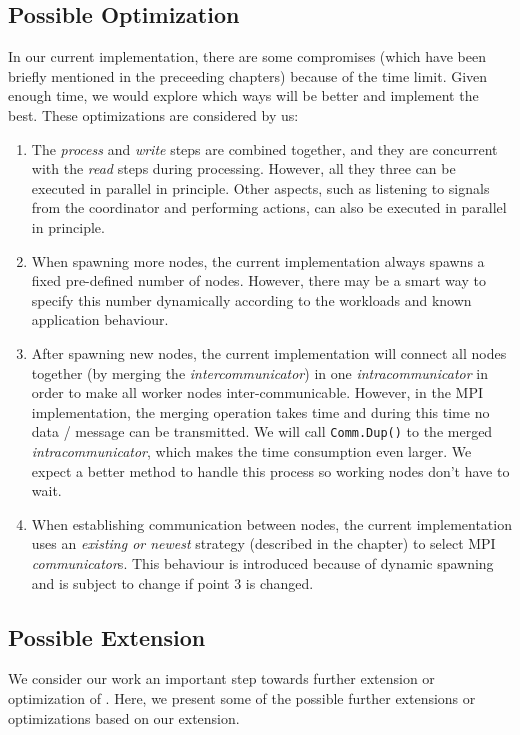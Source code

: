 \subsection{Possible Optimization}
In our current implementation, there are some compromises (which have been briefly mentioned in the preceeding chapters) because of the time limit. Given enough time, we would explore which ways will be better and implement the best. These optimizations are considered by us:

\begin{enumerate}
	\item The \emph{process} and \emph{write} steps are combined together, and they are concurrent with the \emph{read} steps during processing. However, all they three can be executed in parallel in principle. Other aspects, such as listening to signals from the coordinator and performing actions, can also be executed in parallel in principle.
	\item When spawning more nodes, the current implementation always spawns a fixed pre-defined number of nodes. However, there may be a smart way to specify this number dynamically according to the workloads and known application behaviour.
	\item After spawning new nodes, the current implementation will connect all nodes together (by merging the \emph{intercommunicator}) in one \emph{intracommunicator} in order to make all worker nodes inter-communicable. However, in the MPI implementation, the merging operation takes time and during this time no data / message can be transmitted. We will call \lstinline|Comm.Dup()| to the merged \emph{intracommunicator}, which makes the time consumption even larger. We expect a better method to handle this process so working nodes don't have to wait.
	\item When establishing communication between nodes, the current implementation uses an \emph{existing or newest} strategy (described in the \tIncDep chapter) to select MPI \emph{communicator}s. This behaviour is introduced because of dynamic spawning and is subject to change if point 3 is changed.
\end{enumerate}

\subsection{Possible Extension}
We consider our work an important step towards further extension or optimization of \dpy. Here, we present some of the possible further extensions or optimizations based on our extension. \\

